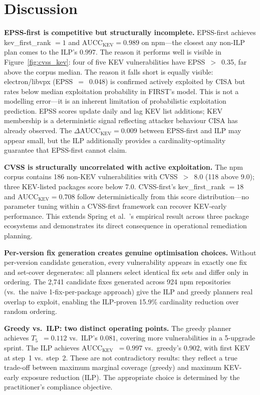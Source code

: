 \documentclass[conference]{IEEEtran}
\newcommand{\aucc}{$\mathrm{AUCC}_{\mathrm{KEV}}$\xspace}
\newcommand{\Tfive}{$T_5$\xspace}
\begin{document}
\section{Discussion}
\label{sec:discussion}

\textbf{EPSS-first is competitive but structurally incomplete.}
EPSS-first achieves kev\_first\_rank $= 1$ and \aucc $= 0.989$ on
npm---the closest any non-ILP plan comes to the ILP's $0.997$.
The reason it performs well is visible in Figure~\ref{fig:cvss_kev}:
four of five KEV vulnerabilities have EPSS~$>$~0.35, far above the
corpus median.  The reason it falls short is equally visible:
electron/libvpx (EPSS~$=$~0.048) is confirmed actively exploited by
CISA but rates below median exploitation probability in FIRST's model.
This is not a modelling error---it is an inherent limitation of
probabilistic exploitation prediction.  EPSS scores update daily and
lag KEV list additions; KEV membership is a deterministic signal
reflecting attacker behaviour CISA has already observed.  The
$\Delta$\aucc $= 0.009$ between EPSS-first and ILP may appear small,
but the ILP additionally provides a cardinality-optimality guarantee
that EPSS-first cannot claim.

\textbf{CVSS is structurally uncorrelated with active exploitation.}
The npm corpus contains 186 non-KEV vulnerabilities with CVSS~$>$~8.0
(118 above 9.0); three KEV-listed packages score below 7.0.
CVSS-first's kev\_first\_rank $= 18$ and \aucc $= 0.708$ follow
deterministically from this score distribution---no parameter tuning
within a CVSS-first framework can recover KEV-early performance.
This extends Spring et al.~\cite{spring21}'s empirical result across
three package ecosystems and demonstrates its direct consequence in
operational remediation planning.

\textbf{Per-version fix generation creates genuine optimisation choices.}
Without per-version candidate generation, every vulnerability appears
in exactly one fix and set-cover degenerates: all planners select
identical fix sets and differ only in ordering.  The 2,741 candidate
fixes generated across 924 npm repositories (vs.\ the naive 1-fix-per-package
approach) give the ILP and greedy planners real overlap to exploit,
enabling the ILP-proven 15.9\% cardinality reduction over random
ordering.

\textbf{Greedy vs.\ ILP: two distinct operating points.}
The greedy planner achieves \Tfive~$= 0.112$ vs.\ ILP's $0.081$,
covering more vulnerabilities in a 5-upgrade sprint.  The ILP achieves
\aucc~$= 0.997$ vs.\ greedy's $0.902$, with first KEV at step~1
vs.\ step~2.  These are not contradictory results: they reflect a true
trade-off between maximum marginal coverage (greedy) and maximum
KEV-early exposure reduction (ILP).  The appropriate choice is
determined by the practitioner's compliance objective.
\end{document}
